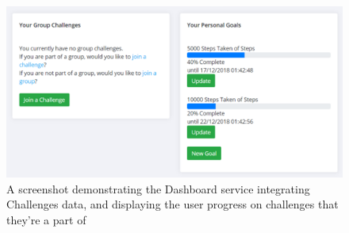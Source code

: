 \begin{figure}[H]
    \centering
    \includegraphics[width=\textwidth]{Images/service_challenges.png}
    \caption{A screenshot demonstrating the Dashboard service integrating Challenges data, and displaying the user progress on challenges that they're a part of}
\end{figure}